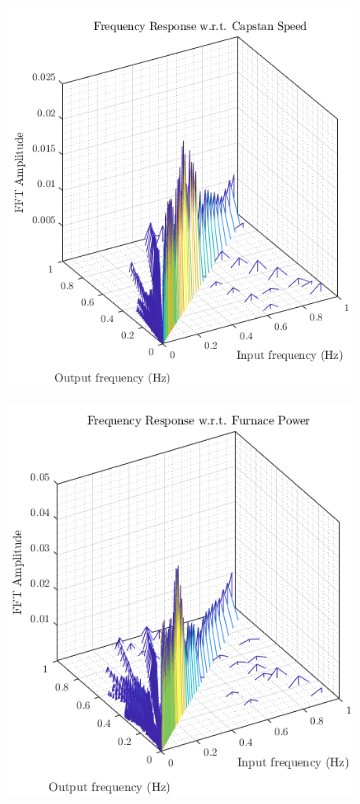 \begin{figure}[hp]
    \centering
    \begin{subfigure}[b]{0.49\textwidth}
        \centering
        \includegraphics[width=\textwidth]{figures/bode_3d_1.png}
    \end{subfigure}
    \hfill
    \begin{subfigure}[b]{0.49\textwidth}
        \centering
        \includegraphics[width=\textwidth]{figures/bode_3d_2.png}
    \end{subfigure}
    

\end{figure}
